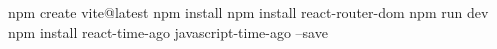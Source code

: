 npm create vite@latest
npm install
npm install react-router-dom
npm run dev
npm install react-time-ago javascript-time-ago --save
